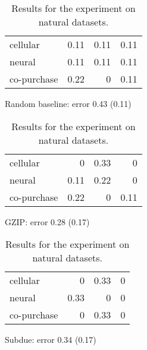 \documentclass{article}
\begin{document}
\begin{table}[h]

\begin{subfigure}[b]{1\columnwidth}
\centering
\begin{tabular}{l |  r r r}
\hline
  cellular      &  0.11 & 0.11 & 0.11 \\
  neural        &  0.11 & 0.11 & 0.11 \\
  co-purchase   &  0.22 & 0    & 0.11 \\
\hline
\end{tabular}
\caption{Random baseline: error 0.43 (0.11)}
\end{subfigure}
\vspace{3mm}

\begin{subfigure}[b]{1\columnwidth}
\centering
\begin{tabular}{l |  r r r}
\hline
  cellular      &  0 & 0.33 & 0 \\
  neural        &  0.11 & 0.22 & 0 \\
  co-purchase   &  0.22 & 0 & 0.11 \\
\hline
\end{tabular}
\caption{GZIP: error 0.28 (0.17)}
\end{subfigure}
\vspace{3mm}

\begin{subfigure}[b]{1\columnwidth}
\centering
\begin{tabular}{l | r r r}
\hline
  cellular      &  0    & 0.33 & 0 \\
  neural        &  0.33 & 0    & 0 \\
  co-purchase   &  0    & 0.33 & 0 \\
\hline
\end{tabular}
\caption{Subdue: error 0.34 (0.17) }
\end{subfigure}
\caption{Results for the experiment on natural datasets.}

\label{table:real-life}

\end{table}


\end{document}
